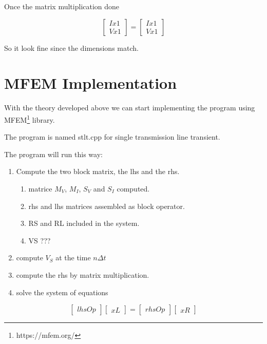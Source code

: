 \documentclass[12pt, letterpaper]{article}
\begin{document}
Once the matrix multiplication done

\begin{equation}
	\begin{bmatrix}
		Ix1 \\
		Vx1 
	\end{bmatrix}
	=
	\begin{bmatrix}
		Ix1 \\
		Vx1
	\end{bmatrix}
\end{equation}

So it look fine since the dimensions match.

\section{MFEM Implementation}

With the theory developed above we can start implementing the program using MFEM\footnote{https://mfem.org/} library.

The program is named stlt.cpp for single transmission line transient.

The program will run this way:


\begin{enumerate}
	\item Compute the two block matrix, the lhs and the rhs.
	
	\begin{enumerate}
		\item matrice $M_V$, $M_I$, $S_V$ and $S_I$ computed.
		\item rhs and lhs matrices assembled as block operator.
		\item RS and RL included in the system.
		\item VS ???
		\end{enumerate}	
	\item compute $V_S$ at the time $n \Delta t$
	\item compute the rhs by matrix multiplication.
	\item solve the system of equations
\end{enumerate}

 \begin{equation}
 	\begin{bmatrix}
 		lhsOp
 	\end{bmatrix}
 	\begin{bmatrix}
 		xL
 	\end{bmatrix}
 	=
 	\begin{bmatrix}
 		rhsOp
 	\end{bmatrix}
 	\begin{bmatrix}
 		xR
 	\end{bmatrix}
 \end{equation}
\end{document}

